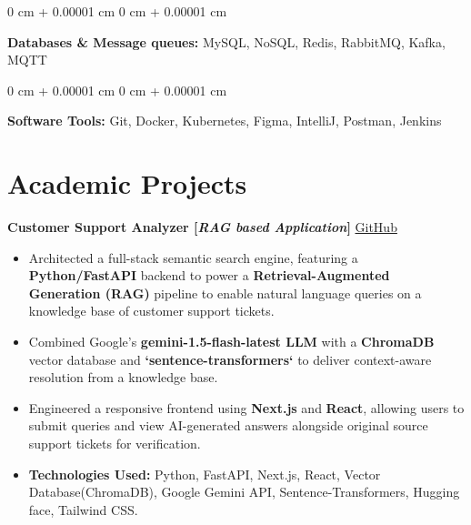 \documentclass[10pt, letterpaper]{article}
\newenvironment{highlights}{
    \begin{itemize}[
        topsep=0.10 cm,     %
        parsep=0.10 cm,     %
        partopsep=0pt,      %
        itemsep=0pt,        %
        leftmargin=0 cm + 10pt  %
    ]
}{
    \end{itemize}
}
\newenvironment{onecolentry}{
    \begin{adjustwidth}{
        0 cm + 0.00001 cm
    }{
        0 cm + 0.00001 cm
    }
}{
    \end{adjustwidth}
}
\begin{document}
        \vspace{0.1 cm}
        
        \begin{onecolentry}
        \textbf{Databases \& Message queues:} MySQL, NoSQL, Redis, RabbitMQ, Kafka, MQTT \  %
        \end{onecolentry}
        
        \vspace{0.1 cm}
        
        \begin{onecolentry}
        \textbf{Software Tools:} Git, Docker, Kubernetes, Figma, IntelliJ, Postman, Jenkins \\  %
        \vspace{0.1 cm}
        \end{onecolentry}


    \section{Academic Projects}

        \noindent
        \textbf{Customer Support Analyzer [\textit{RAG based Application}]} \hfill \href{https://github.com/tushar-fs/customer-support-analyzer}{\small \faGithub \space GitHub}
        
        \begin{highlights}
            \item Architected a full-stack semantic search engine, featuring a \textbf{Python/FastAPI} backend to power a \textbf{Retrieval-Augmented Generation (RAG)} pipeline to enable natural language queries on a knowledge base of customer support tickets.
            \item Combined Google's \textbf{gemini-1.5-flash-latest LLM} with a \textbf{ChromaDB} vector database and \textbf{`sentence-transformers`} to deliver context-aware resolution from a knowledge base.
            \item Engineered a responsive frontend using \textbf{Next.js} and \textbf{React}, allowing users to submit queries and view AI-generated answers alongside original source support tickets for verification.
            \item \textbf{Technologies Used:} Python, FastAPI, Next.js, React, Vector Database(ChromaDB), Google Gemini API, Sentence-Transformers, Hugging face, Tailwind CSS.
        \end{highlights}
\end{document}
